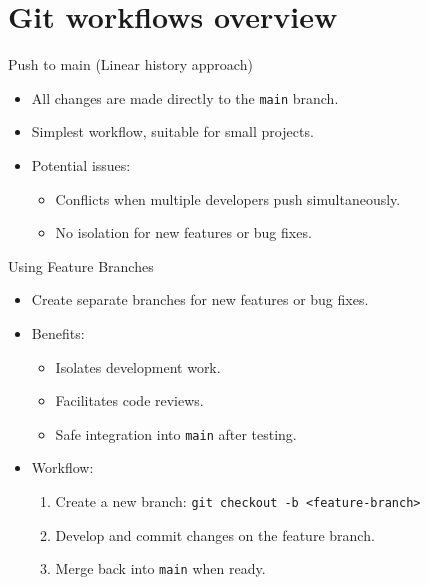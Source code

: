 \documentclass{beamer}
\begin{document}
\section{Git workflows overview}

\begin{frame}{Push to main (Linear history approach)}
  \begin{itemize}
      \item All changes are made directly to the \texttt{main} branch.
      \item Simplest workflow, suitable for small projects.
      \item Potential issues:
      \begin{itemize}
          \item Conflicts when multiple developers push simultaneously.
          \item No isolation for new features or bug fixes.
      \end{itemize}
  \end{itemize}
\end{frame}

\begin{frame}{Using Feature Branches}
  \begin{itemize}
      \item Create separate branches for new features or bug fixes.
      \item Benefits:
      \begin{itemize}
          \item Isolates development work.
          \item Facilitates code reviews.
          \item Safe integration into \texttt{main} after testing.
      \end{itemize}
      \item Workflow:
      \begin{enumerate}
          \item Create a new branch: \texttt{git checkout -b <feature-branch>}
          \item Develop and commit changes on the feature branch.
          \item Merge back into \texttt{main} when ready.
      \end{enumerate}
  \end{itemize}
\end{frame}
\end{document}
